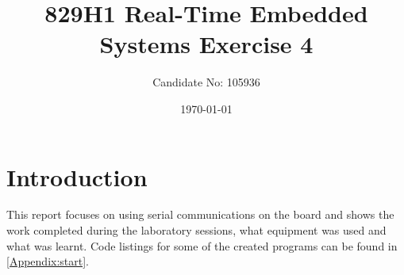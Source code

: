 \documentclass[a4paper,12pt]{scrartcl}
\title{829H1 Real-Time Embedded Systems Exercise 4}
\author{Candidate No: 105936}
\date{\today}
\begin{document}
	
	\begin{titlepage}
		\maketitle
	\end{titlepage}
	
	\tableofcontents
	\newpage
	
	\section{Introduction}
	{
		This report focuses on using serial communications on the board and shows the work completed during the laboratory sessions, what equipment was used and what was learnt. Code listings for some of the created programs can be found in \cref{Appendix:start}.
	}
\end{document}
